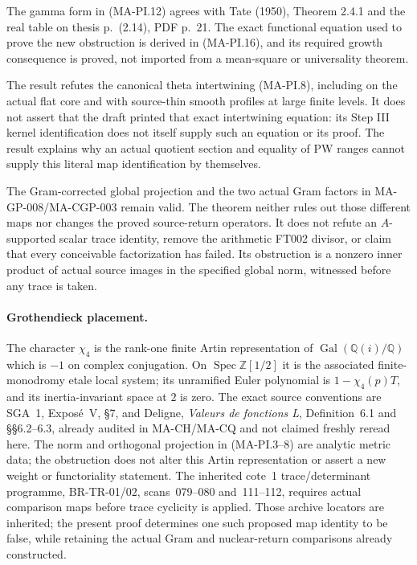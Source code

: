 The gamma form in (MA-PI.12) agrees with Tate (1950),
Theorem 2.4.1 and the real table on thesis p.~(2.14),
PDF p.~21.  The exact functional equation used to
prove the new obstruction is derived in (MA-PI.16),
and its required growth consequence is proved, not
imported from a mean-square or universality theorem.

The result refutes the canonical theta intertwining
(MA-PI.8), including on the actual flat core and with
source-thin smooth profiles at large finite levels.
It does not assert that the draft printed that exact
intertwining equation: its Step III kernel identification
does not itself supply such an equation or its proof.
The result explains why an actual quotient section and
equality of PW ranges cannot supply this literal map
identification by themselves.

The Gram-corrected global projection and the two actual
Gram factors in MA-GP-008/MA-CGP-003 remain valid.
The theorem neither rules out those different maps nor
changes the proved source-return operators.  It does
not refute an $A$-supported scalar trace identity,
remove the arithmetic FT002 divisor, or claim that
every conceivable factorization has failed.  Its
obstruction is a nonzero inner product of actual
source images in the specified global norm, witnessed
before any trace is taken.

\paragraph{Grothendieck placement.}
The character $\chi_4$ is the rank-one finite Artin
representation of $\operatorname{Gal}(\mathbb Q(i)/\mathbb Q)$
which is $-1$ on complex conjugation.  On
$\operatorname{Spec}\mathbb Z[1/2]$ it is the associated
finite-monodromy etale local system; its unramified Euler
polynomial is $1-\chi_4(p)T$, and its inertia-invariant
space at $2$ is zero.  The exact source conventions are
SGA~1, Expos\'e~V, \S7, and Deligne, \emph{Valeurs de
fonctions L}, Definition~6.1 and \S\S6.2--6.3, already
audited in MA-CH/MA-CQ and not claimed freshly reread here.
The norm and orthogonal projection in (MA-PI.3--8) are
analytic metric data; the obstruction does not alter
this Artin representation or assert a new weight or
functoriality statement.  The inherited cote~1
trace/determinant programme, BR-TR-01/02, scans~079--080
and~111--112, requires actual comparison maps before
trace cyclicity is applied.  Those archive locators are
inherited; the present proof determines one such proposed
map identity to be false, while retaining the actual Gram
and nuclear-return comparisons already constructed.
